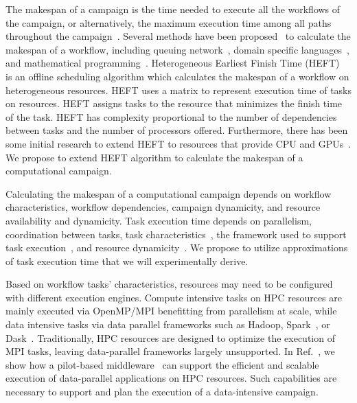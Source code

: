 The makespan of a campaign is the time needed to execute all the workflows of the campaign, or alternatively, the maximum execution time among all paths throughout the campaign~\cite{chirkin2017execution}. Several methods have been proposed~\cite{lu2019review} to calculate the makespan of a workflow, including queuing network~\cite{yao2019throughput,bao2019performance}, domain specific languages~\cite{carothers2017durango,maheshwari2016workflow}, and mathematical programming~\cite{liu2017mathematical}. Heterogeneous Earliest Finish Time (HEFT)~\cite{topcuoglu2002performance} is an offline scheduling algorithm which calculates the makespan of a workflow on heterogeneous resources. HEFT uses a matrix to represent execution time of tasks on resources. HEFT assigns tasks to the resource that minimizes the finish time of the task. HEFT has complexity proportional to the number of dependencies between tasks and the number of processors offered. Furthermore, there has been some initial research to extend HEFT to resources that provide CPU and GPUs~\cite{shetti2013optimization}. We propose to extend HEFT algorithm to calculate the makespan of a computational campaign.

Calculating the makespan of a computational campaign depends on workflow characteristics, workflow dependencies, campaign dynamicity, and resource availability and dynamicity. Task execution time depends on parallelism, coordination between tasks, task characteristics~\cite{khoshlessan2017parallel}, the framework used to support task execution~\cite{paraskevakos2018task}, and resource dynamicity~\cite{paraskevakos2019workflow}. We propose to utilize approximations of task execution time that we will experimentally derive.

Based on workflow tasks’ characteristics, resources may need to be configured with different execution engines. Compute intensive tasks on HPC resources are mainly executed via OpenMP/MPI benefitting from parallelism at scale, while data intensive tasks via data parallel frameworks such as Hadoop, Spark~\cite{zaharia2010spark}, or Dask~\cite{rocklin2015dask}. Traditionally, HPC resources are designed to optimize the execution of MPI tasks, leaving data-parallel frameworks largely unsupported. In Ref.~\cite{luckow2016hadoop}, we show how a pilot-based middleware~\cite{merzky2019using} can support the efficient and scalable execution of data-parallel applications on HPC resources. Such capabilities are necessary to support and plan the execution of a data-intensive campaign.


